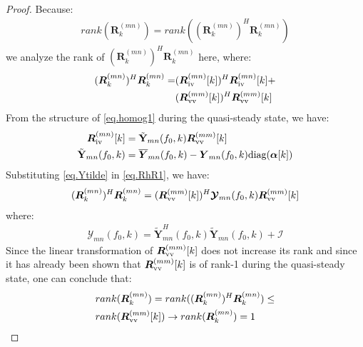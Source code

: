 \documentclass[twocolumn]{IEEEtran}
\newcommand{\bs}{\boldsymbol}
\newcommand{\mb}{\mathbf}
\begin{document}
\begin{proof}
Because:
\begin{align*}
rank(\bs R^{(mn)}_k)=rank((\bs R^{(mn)}_k)^H\bs R^{(mn)}_k)
\end{align*}
we analyze the rank of $(\bs R^{(mn)}_k)^H\bs R^{(mn)}_k$ here, where:
\begin{align}
\begin{split}
(\bs R^{(mn)}_k)^H\bs R^{(mn)}_k=&(\bs R^{(mn)}_{\rm iv}[k])^H\bs R^{(mn)}_{\rm iv}[k]+\\
&(\bs R^{(mm)}_{\rm vv}[k])^H\bs R^{(mm)}_{\rm vv}[k]
\end{split}
\label{eq.RhR1}
\end{align}
From the structure of \eqref{eq.homog1} during the quasi-steady state, we have:
\begin{align}
\begin{split}
\bs R^{(mn)}_{\rm iv}[k]&=\tilde{\mb{Y}}_{mn}(f_0,k)\bs R^{(mm)}_{\rm vv}[k]\\
\tilde{\mb{Y}}_{mn}(f_0,k)&=\overline{\bs Y}_{mn}(f_0,k)-{\bs Y}_{mn}(f_0,k)\text{diag}(\bs{\alpha}[k])
\end{split}
\label{eq.Ytilde}
\end{align}
Substituting \eqref{eq.Ytilde} in \eqref{eq.RhR1}, we have:
\begin{align}
(\bs R^{(mn)}_k)^H\bs R^{(mn)}_k=(\bs R^{(mm)}_{\rm vv}[k])^H\bs{\mathcal{Y}}_{mn}(f_0,k)\bs R^{(mm)}_{\rm vv}[k]
\end{align}
where:
\begin{align*}
\bs{\mathcal{Y}}_{mn}(f_0,k)=\tilde{\mb{Y}}^H_{mn}(f_0,k)\tilde{\mb{Y}}_{mn}(f_0,k)+\mathcal{I} 
\end{align*}
Since the linear transformation of $\bs R^{(mm)}_{\rm vv}[k]$ does not increase its rank and since it has already been shown that $\bs R^{(mm)}_{\rm vv}[k]$ is of rank-1 during the quasi-steady state, one can conclude that:
\begin{align}
\begin{split}
&rank(\bs R^{(mn)}_k)=rank((\bs R^{(mn)}_k)^H\bs R^{(mn)}_k)\leq 
 \\
 & rank(\bs R^{(mm)}_{\rm vv}[k]) \rightarrow  rank(\bs R^{(mn)}_k)=1
\end{split}
\end{align}   
\end{proof}
\end{document}

